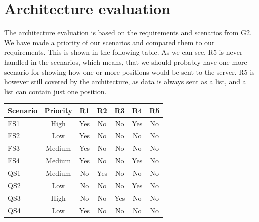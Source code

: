 \documentclass[a4paper,11pt]{report}
\begin{document}
\chapter{Architecture evaluation}
\label{cha:arch-eval}
\thispagestyle{fancy}

The architecture evaluation is based on the requirements and scenarios from G2. 
We have made a priority of our scenarios and compared them to our requirements. This is shown in the following table. As we can see, R5 is never handled in the scenarios, which means, that we should probably have one more scenario for showing how one or more positions would be sent to the server. R5 is however still covered by the architecture, as data is always sent as a list, and a list can contain just one position.


\begin{center}
  \begin{tabular}[h!]{| l | c | c | c | c | c | c |}
    \hline
    \rowcolor{gray}
    Scenario & Priority & R1 & R2 & R3 & R4 & R5 \\
    \hline
    \hline
    FS1 & High & Yes & No & No & Yes & No \\
    \hline
    FS2 & Low & Yes & No & No & No & No \\
    \hline
    FS3 & Medium & Yes & No & No & No & No \\
    \hline
    FS4 & Medium & Yes & No & No & Yes & No \\
    \hline
    QS1 & Medium & No & Yes & No & No & No \\
    \hline
    QS2 & Low & No & No & No & Yes & No \\
    \hline
    QS3 & High & No & No & Yes & No & No \\
    \hline
    QS4 & Low & Yes & No & No & No & No \\
    \hline

 \end{tabular}
\end{center}
\end{document}
